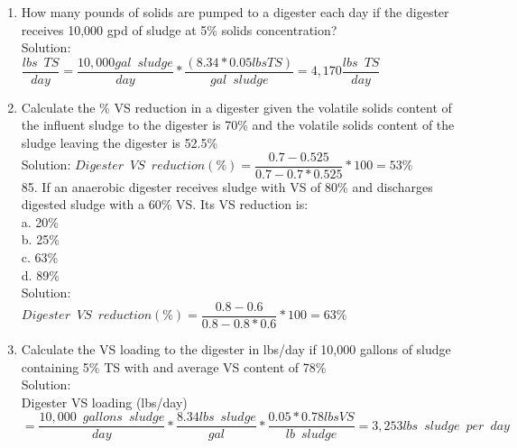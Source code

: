 \documentclass{article}
\begin{document}
\begin{enumerate}
\item How many pounds of solids are pumped to a digester each day if the digester receives 10,000 gpd of sludge at 5\% solids concentration?\\


 

Solution:\\

{
$
	\dfrac{lbs \enspace TS}{day}
	=
	\dfrac{10,000 gal \enspace sludge}{day}
	*
	\dfrac{(8.34*0.05 lbs TS )}{gal \enspace sludge}
	=4,170
	\dfrac{lbs \enspace TS}{day}
$
}\\


\item Calculate the \% VS reduction in a digester given the volatile solids content of the influent sludge to the digester is 70\% and the volatile solids content of the sludge leaving the digester is 52.5\%\\
Solution:  $Digester \enspace VS \enspace reduction (\%)=\dfrac{0.7-0.525}{0.7-0.7*0.525}*100=\boxed{ 53\%}$\\

85. If an anaerobic digester receives sludge with VS of 80\% and discharges digested sludge with a 60\% VS. Its VS reduction is:\\
a. 20\% \\
b. 25\% \\
c. 63\% \\
d. 89\% \\
\vspace{0.5cm}
Solution:\\
\vspace{0.5cm}
$Digester \enspace VS \enspace reduction (\%)=\dfrac{0.8-0.6}{0.8-0.8*0.6}*100=\boxed{ 63\%}$\\

\vspace{0.5cm}
\item Calculate the VS loading to the digester in lbs/day if 10,000 gallons of sludge containing 5\% TS with and average VS content of 78\%\\
Solution:\\
Digester VS loading (lbs/day)\\$=\dfrac{10,000 \enspace gallons \enspace sludge}{day}*\dfrac{8.34lbs \enspace sludge}{gal}*\dfrac{0.05*0.78lbs VS}{lb \enspace sludge}=\boxed{3,253lbs \enspace sludge \enspace per \enspace day}$


\end{enumerate}
\end{document}
